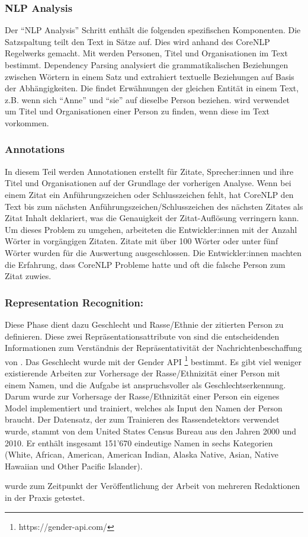 \subsubsection{NLP Analysis}
Der \enquote{NLP Analysis} Schritt enthält die folgenden spezifischen Komponenten.
Die Satzspaltung teilt den Text in Sätze auf. Dies wird anhand des CoreNLP Regelwerks gemacht.
Mit  werden Personen, Titel und Organisationen im Text bestimmt.
Dependency Parsing analysiert die grammatikalischen Beziehungen zwischen Wörtern in einem Satz 
und extrahiert textuelle Beziehungen auf Basis der Abhängigkeiten.
Die  findet Erwähnungen der gleichen Entität in einem Text, z.B. wenn 
sich \enquote{Anne} und \enquote{sie} auf dieselbe Person beziehen.
 wird verwendet um Titel und Organisationen einer Person zu finden, wenn diese
im Text vorkommen. 

\subsubsection{Annotations}
In diesem Teil werden Annotationen erstellt für Zitate, Sprecher:innen und ihre Titel und 
Organisationen auf der Grundlage der vorherigen  Analyse. 
Wenn bei einem Zitat ein Anführungszeichen oder Schlusszeichen fehlt, hat CoreNLP den Text bis 
zum nächsten Anführungszeichen/Schlusszeichen des nächsten Zitates als Zitat Inhalt deklariert, was die Genauigkeit der Zitat-Auflösung verringern kann.
Um dieses Problem zu umgehen, arbeiteten die Entwickler:innen mit der Anzahl Wörter in vorgängigen Zitaten.
Zitate mit über 100 Wörter oder unter fünf Wörter wurden für die Auswertung ausgeschlossen.
Die Entwickler:innen machten die Erfahrung, dass CoreNLP Probleme hatte und oft die falsche Person zum Zitat zuwies.

\subsubsection{Representation Recognition:}
Diese Phase dient dazu Geschlecht und Rasse/Ethnie der zitierten Person zu definieren.
Diese zwei Repräsentationsattribute von  sind die entscheidenden Informationen zum Verständnis der Repräsentativität der Nachrichtenbeschaffung von .
Das Geschlecht wurde mit der Gender API \footnote{https://gender-api.com/} bestimmt.
Es gibt viel weniger existierende Arbeiten zur Vorhersage der Rasse/Ethnizität
einer Person mit einem Namen, und die Aufgabe ist anspruchsvoller als Geschlechtserkennung.
Darum wurde zur Vorhersage der Rasse/Ethnizität einer Person ein eigenes  Model implementiert und trainiert, 
welches als Input den Namen der Person braucht.
Der Datensatz, der zum Trainieren des Rassendetektors verwendet wurde, stammt von dem United States Census Bureau aus den Jahren 2000 und 2010. 
Er enthält insgesamt 151'670 eindeutige Namen in sechs Kategorien (White, African, American, American Indian, Alaska Native, Asian, Native
Hawaiian und Other Pacific Islander).

 wurde zum Zeitpunkt der Veröffentlichung der Arbeit von mehreren Redaktionen in der Praxis getestet.